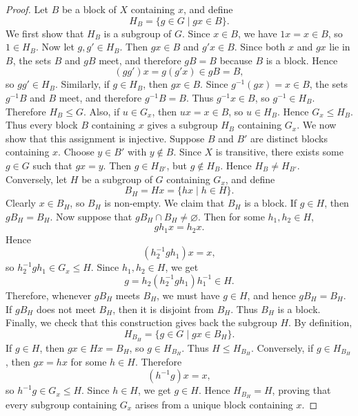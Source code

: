 \documentclass[../Odyssey_Project.tex]{subfiles}
\begin{document}
\begin{proof}
    Let $B$ be a block of $X$ containing $x$, and define
    \[
        H_B = \{g \in G \mid gx \in B\}.
    \]
    We first show that $H_B$ is a subgroup of $G$. Since $x \in B$, we have $1x = x \in B$, so $1 \in H_B$. Now let $g,g' \in H_B$. Then $gx \in B$ and $g'x \in B$. Since both $x$ and $gx$ lie in $B$, the sets $B$ and $gB$ meet, and therefore $gB = B$ because $B$ is a block. Hence
    \[
        (gg')x = g(g'x) \in gB = B,
    \]
    so $gg' \in H_B$. Similarly, if $g \in H_B$, then $gx \in B$. Since $g^{-1}(gx) = x \in B$, the sets $g^{-1}B$ and $B$ meet, and therefore $g^{-1}B = B$. Thus $g^{-1}x \in B$, so $g^{-1} \in H_B$. Therefore $H_B \leq G$. Also, if $u \in G_x$, then $ux = x \in B$, so $u \in H_B$. Hence $G_x \leq H_B$.\\
    Thus every block $B$ containing $x$ gives a subgroup $H_B$ containing $G_x$. We now show that this assignment is injective. Suppose $B$ and $B'$ are distinct blocks containing $x$. Choose $y \in B'$ with $y \notin B$. Since $X$ is transitive, there exists some $g \in G$ such that $gx = y$. Then $g \in H_{B'}$, but $g \notin H_B$. Hence $H_B \neq H_{B'}$. \\
    Conversely, let $H$ be a subgroup of $G$ containing $G_x$, and define
    \[
        B_H = Hx = \{hx \mid h \in H\}.
    \]
    Clearly $x \in B_H$, so $B_H$ is non-empty. We claim that $B_H$ is a block. If $g \in H$, then $gB_H = B_H$. Now suppose that $gB_H \cap B_H \neq \varnothing$. Then for some $h_1,h_2 \in H$,
    \[
        gh_1x = h_2x.
    \]
    Hence
    \[
        (h_2^{-1}gh_1)x = x,
    \]
    so $h_2^{-1}gh_1 \in G_x \leq H$. Since $h_1,h_2 \in H$, we get
    \[
        g = h_2(h_2^{-1}gh_1)h_1^{-1} \in H.
    \]
    Therefore, whenever $gB_H$ meets $B_H$, we must have $g \in H$, and hence $gB_H = B_H$. If $gB_H$ does not meet $B_H$, then it is disjoint from $B_H$. Thus $B_H$ is a block.\\
    Finally, we check that this construction gives back the subgroup $H$. By definition,
    \[
        H_{B_H} = \{g \in G \mid gx \in B_H\}.
    \]
    If $g \in H$, then $gx \in Hx = B_H$, so $g \in H_{B_H}$. Thus $H \leq H_{B_H}$. Conversely, if $g \in H_{B_H}$, then $gx = hx$ for some $h \in H$. Therefore
    \[
        (h^{-1}g)x = x,
    \]
    so $h^{-1}g \in G_x \leq H$. Since $h \in H$, we get $g \in H$. Hence $H_{B_H} = H$, proving that every subgroup containing $G_x$ arises from a unique block containing $x$.
\end{proof}
\end{document}
